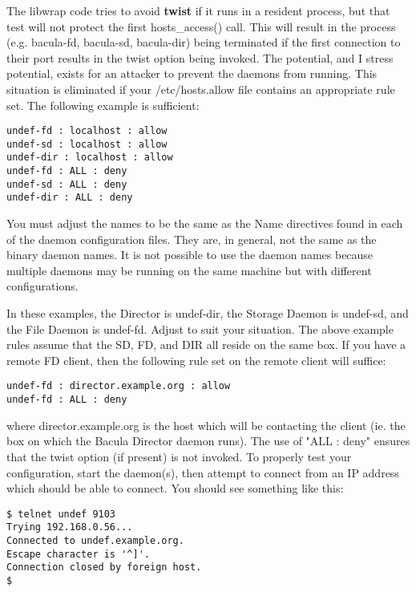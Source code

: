 The libwrap code tries to avoid {\bf twist} if it runs in a resident process,
but that test will not protect the first hosts\_access() call. This will
result in the process (e.g. bacula-fd, bacula-sd, bacula-dir) being terminated
if the first connection to their port results in the twist option being
invoked. The potential, and I stress potential, exists for an attacker to
prevent the daemons from running. This situation is eliminated if your
/etc/hosts.allow file contains an appropriate rule set. The following example
is sufficient: 

\footnotesize
\begin{verbatim}
undef-fd : localhost : allow
undef-sd : localhost : allow
undef-dir : localhost : allow
undef-fd : ALL : deny
undef-sd : ALL : deny
undef-dir : ALL : deny
\end{verbatim}
\normalsize

You must adjust the names to be the same as the Name directives found
in each of the daemon configuration files. They are, in general, not the
same as the binary daemon names. It is not possible to use the 
daemon names because multiple daemons may be running on the same machine
but with different configurations.

In these examples, the Director is undef-dir, the
Storage Daemon is undef-sd, and the File Daemon is undef-fd. Adjust to suit
your situation. The above example rules assume that the SD, FD, and DIR all
reside on the same box. If you have a remote FD client, then the following
rule set on the remote client will suffice: 

\footnotesize
\begin{verbatim}
undef-fd : director.example.org : allow
undef-fd : ALL : deny
\end{verbatim}
\normalsize

where director.example.org is the host which will be contacting the client
(ie. the box on which the Bacula Director daemon runs). The use of "ALL :
deny" ensures that the twist option (if present) is not invoked. To properly
test your configuration, start the daemon(s), then attempt to connect from an
IP address which should be able to connect. You should see something like
this: 

\footnotesize
\begin{verbatim}
$ telnet undef 9103
Trying 192.168.0.56...
Connected to undef.example.org.
Escape character is '^]'.
Connection closed by foreign host.
$
\end{verbatim}
\normalsize

